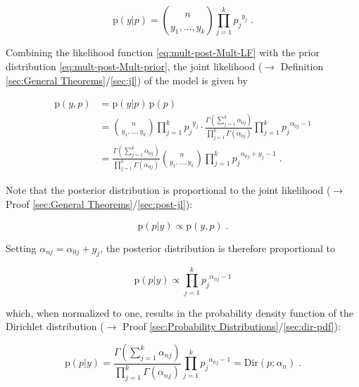 \documentclass[a4paper,12pt,twoside]{book}
\begin{document}
\begin{equation} \label{eq:mult-post-Mult-LF}
\mathrm{p}(y|p) = {n \choose {y_1, \ldots, y_k}} \prod_{j=1}^{k} {p_j}^{y_j} \; .
\end{equation}

Combining the likelihood function \eqref{eq:mult-post-Mult-LF} with the prior distribution \eqref{eq:mult-post-Mult-prior}, the joint likelihood ($\rightarrow$ Definition \ref{sec:General Theorems}/\ref{sec:jl}) of the model is given by

\begin{equation} \label{eq:mult-post-Mult-JL}
\begin{split}
\mathrm{p}(y,p) &= \mathrm{p}(y|p) \, \mathrm{p}(p) \\
&= {n \choose {y_1, \ldots, y_k}} \prod_{j=1}^{k} {p_j}^{y_j} \cdot \frac{\Gamma \left( \sum_{j=1}^{k} \alpha_{0j} \right)}{\prod_{j=1}^k \Gamma(\alpha_{0j})} \prod_{j=1}^{k} {p_j}^{\alpha_{0j}-1} \\
&= \frac{\Gamma \left( \sum_{j=1}^{k} \alpha_{0j} \right)}{\prod_{j=1}^k \Gamma(\alpha_{0j})} {n \choose {y_1, \ldots, y_k}} \prod_{j=1}^{k} {p_j}^{\alpha_{0j}+y_j-1} \; .
\end{split}
\end{equation}

Note that the posterior distribution is proportional to the joint likelihood ($\rightarrow$ Proof \ref{sec:General Theorems}/\ref{sec:post-jl}):

\begin{equation} \label{eq:mult-post-Mult-post-s1}
\mathrm{p}(p|y) \propto \mathrm{p}(y,p) \; .
\end{equation}

Setting $\alpha_{nj} = \alpha_{0j} + y_j$, the posterior distribution is therefore proportional to

\begin{equation} \label{eq:mult-post-Mult-post-s2}
\mathrm{p}(p|y) \propto \prod_{j=1}^{k} {p_j}^{\alpha_{nj}-1}
\end{equation}

which, when normalized to one, results in the probability density function of the Dirichlet distribution ($\rightarrow$ Proof \ref{sec:Probability Distributions}/\ref{sec:dir-pdf}):

\begin{equation} \label{eq:mult-post-Mult-post-qed}
\mathrm{p}(p|y) = \frac{\Gamma \left( \sum_{j=1}^{k} \alpha_{nj} \right)}{\prod_{j=1}^k \Gamma(\alpha_{nj})} \prod_{j=1}^{k} {p_j}^{\alpha_{nj}-1} = \mathrm{Dir}(p; \alpha_n) \; .
\end{equation}
\end{document}
